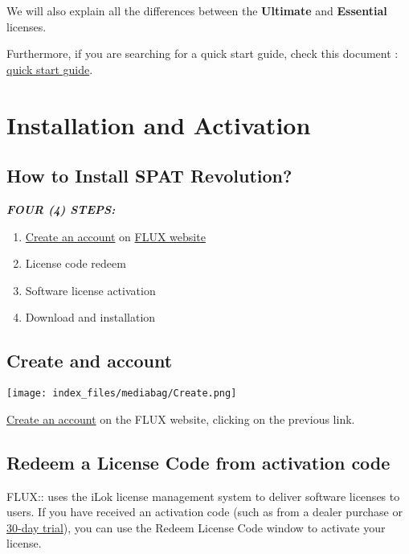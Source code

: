 \documentclass[
  letterpaper,
  DIV=11,
  numbers=noendperiod]{scrreport}
\providecommand{\tightlist}{%
  \setlength{\itemsep}{0pt}\setlength{\parskip}{0pt}}\usepackage{longtable,booktabs,array}
\begin{document}
We will also explain all the differences between the \textbf{Ultimate}
and \textbf{Essential} licenses.

Furthermore, if you are searching for a quick start guide, check this
document :
\href{https://public.3.basecamp.com/p/BoK99VxRwAJ2fFM9VGSzS3Am}{quick
start guide}.

\hypertarget{installation-and-activation}{%
\chapter{Installation and
Activation}\label{installation-and-activation}}

\hypertarget{how-to-install-spat-revolution}{%
\section{How to Install SPAT
Revolution?}\label{how-to-install-spat-revolution}}

\textbf{\emph{FOUR (4) STEPS:}}

\begin{enumerate}
\def\labelenumi{\arabic{enumi}.}
\tightlist
\item
  \href{https://shop.flux.audio/en_US/login}{Create an account} on
  \href{flux.audio}{FLUX website}
\item
  License code redeem
\item
  Software license activation
\item
  Download and installation
\end{enumerate}

\hypertarget{create-and-account}{%
\section{Create and account}\label{create-and-account}}

\texttt{[image: index\_files/mediabag/Create.png]}

\href{https://shop.flux.audio/en_US/login}{Create an account} on the
FLUX website, clicking on the previous link.

\hypertarget{redeem-a-license-code-from-activation-code}{%
\section{Redeem a License Code from activation
code}\label{redeem-a-license-code-from-activation-code}}

FLUX:: uses the iLok license management system to deliver software
licenses to users. If you have received an activation code (such as from
a dealer purchase or
\href{https://shop.flux.audio/en_US/page/trial-request-information}{30-day
trial}), you can use the Redeem License Code window to activate your
license.
\end{document}
